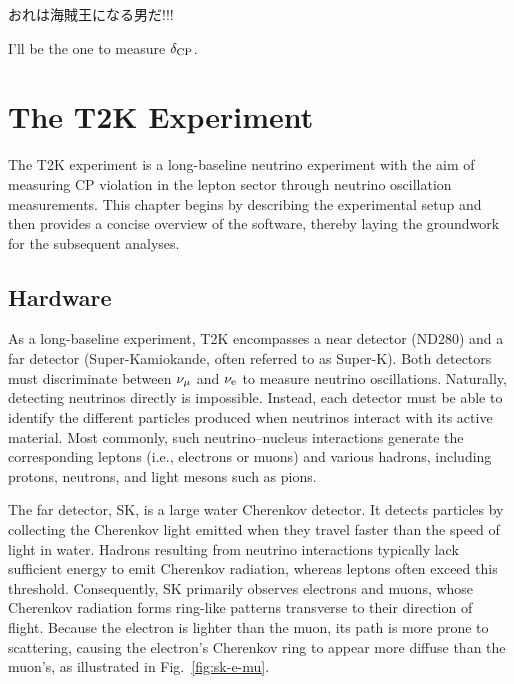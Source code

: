 \begin{savequote}[8cm]
\begin{CJK*}{UTF8}{min}
おれは海賊王になる男だ!!!
\end{CJK*}

I'll be the one to measure $\delta_\textrm{CP}$.
\end{savequote}

\chapter{\label{ch:t2k}The T2K Experiment} 

\minitoc
The T2K experiment is a long-baseline neutrino experiment with the aim of measuring CP violation in the lepton sector through neutrino oscillation measurements.  
This chapter begins by describing the experimental setup and then provides a concise overview of the software, thereby laying the groundwork for the subsequent analyses.

\section{Hardware}
As a long-baseline experiment, T2K encompasses a near detector (ND280) and a far detector (Super-Kamiokande, often referred to as Super-K).  
Both detectors must discriminate between \(\nu_{\mu}\) and \(\nu_{\textrm{e}}\) to measure neutrino oscillations.  
Naturally, detecting neutrinos directly is impossible.  
Instead, each detector must be able to identify the different particles produced when neutrinos interact with its active material.  
Most commonly, such neutrino–nucleus interactions generate the corresponding leptons (i.e., electrons or muons) and various hadrons, including protons, neutrons, and light mesons such as pions.

The far detector, SK, is a large water Cherenkov detector.  
It detects particles by collecting the Cherenkov light emitted when they travel faster than the speed of light in water.  
Hadrons resulting from neutrino interactions typically lack sufficient energy to emit Cherenkov radiation, whereas leptons often exceed this threshold.  
Consequently, SK primarily observes electrons and muons, whose Cherenkov radiation forms ring-like patterns transverse to their direction of flight.  
Because the electron is lighter than the muon, its path is more prone to scattering, causing the electron’s Cherenkov ring to appear more diffuse than the muon’s, as illustrated in Fig.~\ref{fig:sk-e-mu}.

